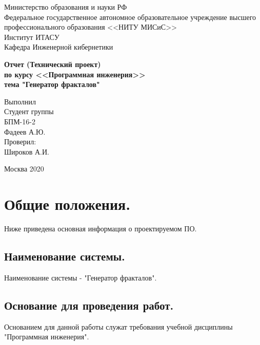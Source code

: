 \documentclass[a4paper,12pt,preview]{report} %
\begin{document}
	
	\begin{center}
		Министерство образования и науки РФ \\
		Федеральное государственное автономное образовательное учреждение высшего профессионального образования <<НИТУ МИСиС>>\\
		Институт ИТАСУ\\
		Кафедра Инженерной кибернетики\\
	\end{center}
	
	
	\vfill
	
	\begin{center}
		\Large\textbf{Отчет  (Технический проект) \\
			по курсу <<Программная инженерия>>\\
			тема "Генератор фракталов"}
	\end{center}
	
	\vfill
	
	\begin{FlushRight}
		Выполнил\\
		Студент группы \\
		БПМ-16-2 \\
		Фадеев А.Ю. \\
		[\baselineskip]
		Проверил: \\
		Широков А.И. \\
		[9\baselineskip]
	\end{FlushRight}
	
	
	\begin{center}
		Москва 2020
	\end{center}
	
	\thispagestyle{empty}
	\newpage
	
	\tableofcontents
	\newpage
	
	\section{Общие положения.}
	
	Ниже приведена основная информация о проектируемом ПО.
	
	\subsection{Наименование системы.}
	Наименование системы - "Генератор фракталов".
	
	\subsection{Основание для проведения работ.}
	Основанием для данной работы служат требования учебной дисциплины "Программная инженерия".
	
\end{document}
